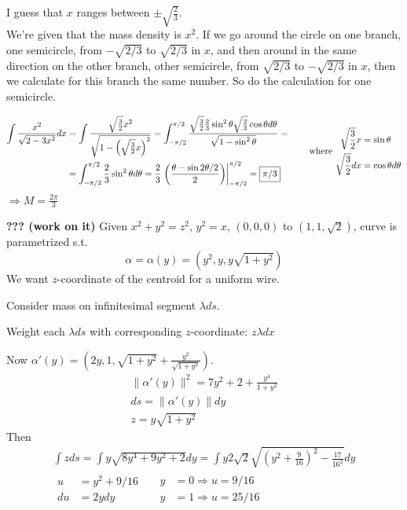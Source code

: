 \documentclass[twoside]{amsart}
\theoremstyle{plain}
\theoremstyle{definition}
\newcommand{\exercisehead}[1]
  {
   \noindent{\small\bf Exercise #1.}
   \smallskip}
\begin{document}
I guess that $x$ ranges between $\pm \sqrt{ \frac{2}{3} }$.  \\
We're given that the mass density is $x^2$.  If we go around the circle on one branch, one semicircle, from $-\sqrt{2/3}$ to $\sqrt{2/3}$ in $x$, and then around in the same direction on the other branch, other semicircle, from $\sqrt{2/3}$ to $-\sqrt{2/3}$ in $x$, then we calculate for this branch the same number.  So do the calculation for one semicircle.

\[
\begin{aligned}
  \int \frac{x^2}{ \sqrt{ 2- 3x^2}} dx & = \int \frac{ \sqrt{ \frac{3}{2} } x^2 }{ \sqrt{ 1 - \left( \sqrt{ \frac{3}{2} } x \right)^2 } } = \int_{-\pi/2}^{\pi/2} \frac{ \sqrt{ \frac{3}{2} } \frac{2}{3} \sin^2{\theta} \sqrt{ \frac{2}{3} } \cos{\theta} d\theta}{ \sqrt{ 1 - \sin^2{\theta} } } = \\ 
  & = \int_{-\pi/2}^{\pi/2} \frac{2}{3} \sin^2{\theta} d\theta = \frac{2}{3} \left. \left( \frac{ \theta - \sin{2\theta}/2}{ 2} \right) \right|_{-\pi/2}^{\pi/2} = \boxed{ \pi/3} 
\end{aligned} \quad \quad \text{ where } \begin{aligned}
    \sqrt{ \frac{3}{2} } x & = \sin{\theta} \\ 
    \sqrt{ \frac{3}{2} } dx & = \cos{\theta} d\theta
  \end{aligned} \\
\]
$ \Longrightarrow M = \boxed{ \frac{2 \pi}{3} }$

\exercisehead{14} \textbf{??? (work on it)} Given $x^2  +y^2 = z^2$, $y^2 = x$, $(0,0,0)$ to $(1,1,\sqrt{2})$, curve is parametrized s.t.
\[
\alpha = \alpha(y) = (y^2, y, y\sqrt{ 1 +y^2})
\]
We want $z$-coordinate of the centroid for a uniform wire.  

Consider mass on infinitesimal segment $\lambda ds$.  

Weight each $\lambda ds$ with corresponding $z$-coordinate: $z\lambda dx$

Now $\alpha'(y) = (2y, 1, \sqrt{1 +y^2} + \frac{ y^2}{\sqrt{ 1 + y^2} } )$.  
\[
\begin{gathered}
  \| \alpha'(y) \|^2 = 7y^2 + 2 + \frac{y^4}{ 1 + y^2} \\
  ds = \| \alpha'(y) \| dy \\
z = y \sqrt{ 1 + y^2 }
\end{gathered}
\]
Then 
\[
\begin{gathered}
  \int z ds = \int y \sqrt{ 8y^4 + 9y^2 + 2 } dy = \int y 2 \sqrt{2} \sqrt{ (y^2 + \frac{9}{16} )^2 - \frac{17}{16^2} } dy \\ 
  \begin{aligned} u & = y^2 + 9/16 \\ du & = 2 y dy \end{aligned} \quad \, \begin{aligned} y & = 0 \Longrightarrow u = 9/16 \\ y & = 1 \Longrightarrow u = 25/16 \end{aligned}
\end{gathered}
\]
\end{document}

